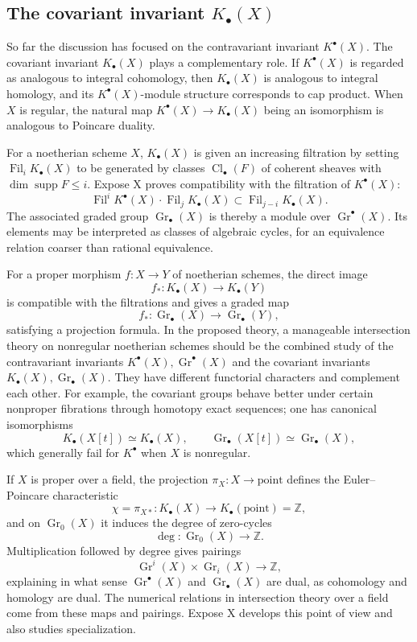 \documentclass[11pt]{article}
\theoremstyle{plain}
\theoremstyle{definition}
\theoremstyle{remark}
\newcommand{\ZZ}{\mathbb Z}
\DeclareMathOperator{\Gr}{Gr}
\DeclareMathOperator{\supp}{supp}
\providecommand{\Cl}{\operatorname{Cl}}
\providecommand{\Fil}{\operatorname{Fil}}
\begin{document}
\subsection{The covariant invariant $K_{\bullet}(X)$}

So far the discussion has focused on the contravariant invariant $K^{\bullet}(X)$. The covariant invariant $K_{\bullet}(X)$ plays a complementary role. If $K^{\bullet}(X)$ is regarded as analogous to integral cohomology, then $K_{\bullet}(X)$ is analogous to integral homology, and its $K^{\bullet}(X)$-module structure corresponds to cap product. When $X$ is regular, the natural map $K^{\bullet}(X)\to K_{\bullet}(X)$ being an isomorphism is analogous to Poincare duality.

For a noetherian scheme $X$, $K_{\bullet}(X)$ is given an increasing filtration by setting $\Fil_iK_{\bullet}(X)$ to be generated by classes $\Cl_{\bullet}(F)$ of coherent sheaves with $\dim\supp F\leq i$. Expose X proves compatibility with the filtration of $K^{\bullet}(X)$:
\begin{equation}\label{eq:capfiltration}
   \Fil^iK^{\bullet}(X)\cdot\Fil_jK_{\bullet}(X)
   \subset \Fil_{j-i}K_{\bullet}(X).
\end{equation}
The associated graded group $\Gr_{\bullet}(X)$ is thereby a module over $\Gr^{\bullet}(X)$. Its elements may be interpreted as classes of algebraic cycles, for an equivalence relation coarser than rational equivalence.

For a proper morphism $f:X\to Y$ of noetherian schemes, the direct image
\[
   f_*:K_{\bullet}(X)\to K_{\bullet}(Y)
\]
is compatible with the filtrations and gives a graded map
\[
   f_*:\Gr_{\bullet}(X)\to\Gr_{\bullet}(Y),
\]
satisfying a projection formula. In the proposed theory, a manageable intersection theory on nonregular noetherian schemes should be the combined study of the contravariant invariants $K^{\bullet}(X),\Gr^{\bullet}(X)$ and the covariant invariants $K_{\bullet}(X),\Gr_{\bullet}(X)$. They have different functorial characters and complement each other. For example, the covariant groups behave better under certain nonproper fibrations through homotopy exact sequences; one has canonical isomorphisms
\[
   K_{\bullet}(X[t])\simeq K_{\bullet}(X),\qquad
   \Gr_{\bullet}(X[t])\simeq \Gr_{\bullet}(X),
\]
which generally fail for $K^{\bullet}$ when $X$ is nonregular.

If $X$ is proper over a field, the projection $\pi_X:X\to\mathrm{point}$ defines the Euler--Poincare characteristic
\[
   \chi=\pi_{X*}:K_{\bullet}(X)\to K_{\bullet}(\mathrm{point})=\ZZ,
\]
and on $\Gr_0(X)$ it induces the degree of zero-cycles
\[
   \deg:\Gr_0(X)\to\ZZ.
\]
Multiplication followed by degree gives pairings
\[
   \Gr^i(X)\times \Gr_i(X)\to\ZZ,
\]
explaining in what sense $\Gr^{\bullet}(X)$ and $\Gr_{\bullet}(X)$ are dual, as cohomology and homology are dual. The numerical relations in intersection theory over a field come from these maps and pairings. Expose X develops this point of view and also studies specialization.
\end{document}
